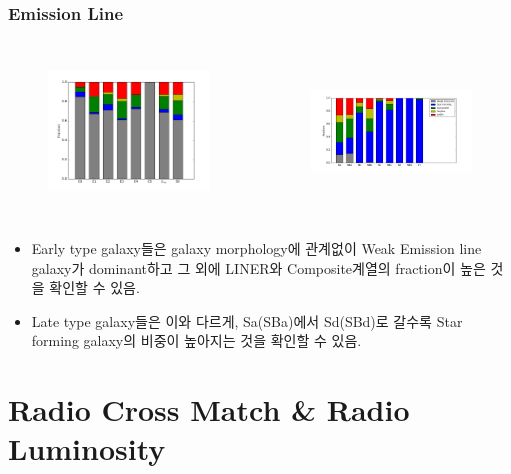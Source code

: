 \documentclass[xcolor={dvipsnames,table}]{beamer}
\newcommand\SM{\fontsize{8}{7.2}\selectfont}
\begin{document}
\begin{frame}
 \frametitle{Emission Line}
 \SM
  \begin{columns}[t]
   \begin{figure}
    \centering
    \includegraphics[width=6cm, height=4cm]{Earlybar.png}
   \end{figure}
   \begin{figure}
    \centering
    \includegraphics[width=6cm, height=4cm]{Latebar.png}
   \end{figure}
  \end{columns}
\vspace{0.2cm}
\begin{itemize}
 \item  Early type galaxy들은 galaxy morphology에 관계없이 Weak Emission line galaxy가 dominant하고 그 외에 LINER와 Composite계열의
 fraction이 높은 것을 확인할 수 있음.
 \item  Late type galaxy들은 이와 다르게, Sa(SBa)에서 Sd(SBd)로 갈수록 Star forming galaxy의 비중이 높아지는 것을 확인할 수 있음.
\end{itemize}
\end{frame}

\section{Radio Cross Match \& Radio Luminosity}
\end{document}
